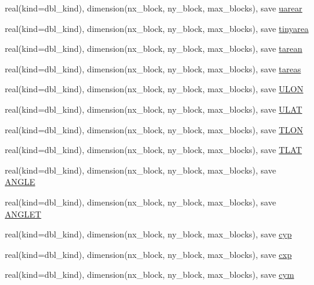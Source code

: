 \begin{DoxyCompactItemize}
\item 
real(kind=dbl\_\-kind), dimension(nx\_\-block, ny\_\-block, max\_\-blocks), save \hyperlink{namespaceice__grid_acf709799675ca52c31d335eb09a46fcf}{uarear}
\item 
real(kind=dbl\_\-kind), dimension(nx\_\-block, ny\_\-block, max\_\-blocks), save \hyperlink{namespaceice__grid_a24fc3cf53e5e2c356bd8e4110112f39c}{tinyarea}
\item 
real(kind=dbl\_\-kind), dimension(nx\_\-block, ny\_\-block, max\_\-blocks), save \hyperlink{namespaceice__grid_a233932d1edd125ed1e3c0cc7b990f256}{tarean}
\item 
real(kind=dbl\_\-kind), dimension(nx\_\-block, ny\_\-block, max\_\-blocks), save \hyperlink{namespaceice__grid_ad08766f36b378acddead7f3503d7be19}{tareas}
\item 
real(kind=dbl\_\-kind), dimension(nx\_\-block, ny\_\-block, max\_\-blocks), save \hyperlink{namespaceice__grid_a15766c63c75fd52d6d8ea3d651ecba26}{ULON}
\item 
real(kind=dbl\_\-kind), dimension(nx\_\-block, ny\_\-block, max\_\-blocks), save \hyperlink{namespaceice__grid_a98cabaeec38bbcfe0d2844d8dae12434}{ULAT}
\item 
real(kind=dbl\_\-kind), dimension(nx\_\-block, ny\_\-block, max\_\-blocks), save \hyperlink{namespaceice__grid_a2b90fd0fa35a54c0313dac995f929ee7}{TLON}
\item 
real(kind=dbl\_\-kind), dimension(nx\_\-block, ny\_\-block, max\_\-blocks), save \hyperlink{namespaceice__grid_a76fff4cfe2a27c44abe9fd445f806f25}{TLAT}
\item 
real(kind=dbl\_\-kind), dimension(nx\_\-block, ny\_\-block, max\_\-blocks), save \hyperlink{namespaceice__grid_a0a538e97fcd87790e7fae5de82bd0e77}{ANGLE}
\item 
real(kind=dbl\_\-kind), dimension(nx\_\-block, ny\_\-block, max\_\-blocks), save \hyperlink{namespaceice__grid_aa8fc09d102ada560318d68276c1dfd57}{ANGLET}
\item 
real(kind=dbl\_\-kind), dimension(nx\_\-block, ny\_\-block, max\_\-blocks), save \hyperlink{namespaceice__grid_a30e2151554a97e140124f4cb4317a054}{cyp}
\item 
real(kind=dbl\_\-kind), dimension(nx\_\-block, ny\_\-block, max\_\-blocks), save \hyperlink{namespaceice__grid_a3c40a8ee2794b13b04b0598c90bf420f}{cxp}
\item 
real(kind=dbl\_\-kind), dimension(nx\_\-block, ny\_\-block, max\_\-blocks), save \hyperlink{namespaceice__grid_adb5e2792c5861e949ad784e35f485c08}{cym}
\item 

\end{DoxyCompactItemize}

